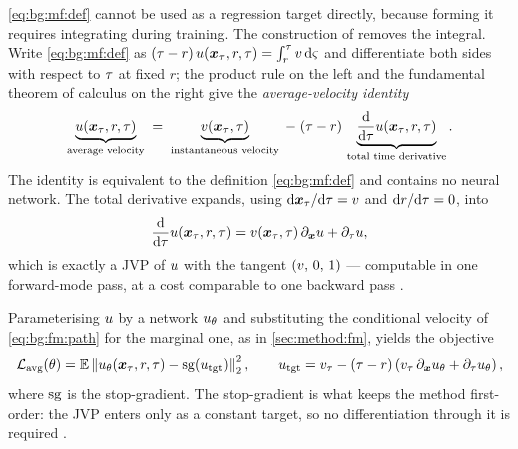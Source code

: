 \eqref{eq:bg:mf:def} cannot be used as a regression target directly, because forming it
requires integrating during training. The construction of \parencite[Eqs.~(4)--(6)]{geng2025meanflow}
removes the
integral. Write \eqref{eq:bg:mf:def} as
$(\tau-r)\,u(\boldsymbol{x}_{\tau},r,\tau) = \int_{r}^{\tau}v\,\mathrm{d}\varsigma$ and
differentiate both sides with respect to $\tau$ at fixed $r$; the product rule on the left
and the fundamental theorem of calculus on the right give the \emph{average-velocity identity}
\begin{equation}\label{eq:bg:mf:identity}
  \underbrace{u(\boldsymbol{x}_{\tau},r,\tau)}_{\text{average velocity}}
  \;=\;
  \underbrace{v(\boldsymbol{x}_{\tau},\tau)}_{\text{instantaneous velocity}}
  \;-\;(\tau-r)\,
  \underbrace{\frac{\mathrm{d}}{\mathrm{d}\tau}u(\boldsymbol{x}_{\tau},r,\tau)}_{\text{total time derivative}} .
\end{equation}
The identity is equivalent to the definition \eqref{eq:bg:mf:def} and contains no neural
network. The total derivative expands, using $\mathrm{d}\boldsymbol{x}_{\tau}/\mathrm{d}\tau = v$ and
$\mathrm{d} r/\mathrm{d}\tau = 0$, into
\begin{equation}\label{eq:bg:mf:jvp}
  \frac{\mathrm{d}}{\mathrm{d}\tau}u(\boldsymbol{x}_{\tau},r,\tau)
  = v(\boldsymbol{x}_{\tau},\tau)\,\partial_{\boldsymbol{x}}u + \partial_{\tau}u ,
\end{equation}
which is exactly a \ac{JVP} of $u$ with the tangent
$(v,\,0,\,1)$ --- computable in one forward-mode pass, at a cost comparable to one
backward pass \parencite[Eqs.~(7)--(8)]{geng2025meanflow}.

Parameterising $u$ by a network $u_{\theta}$ and substituting the conditional
velocity of \eqref{eq:bg:fm:path} for the marginal one, as in \autoref{sec:method:fm}, yields the
objective
\begin{equation}\label{eq:bg:mf:loss}
  \mathcal{L}_{\textrm{avg}}(\theta)
  = \mathbb{E}\left\|u_{\theta}(\boldsymbol{x}_{\tau},r,\tau)
      - \operatorname{sg}\!\left(u_{\textrm{tgt}}\right)\right\|_{2}^{2},
  \qquad
  u_{\textrm{tgt}} = v_{\tau} - (\tau-r)\left(
     v_{\tau}\,\partial_{\boldsymbol{x}}u_{\theta} + \partial_{\tau}u_{\theta}\right),
\end{equation}
where $\operatorname{sg}$ is the stop-gradient. The stop-gradient is what keeps the method first-order: the
\ac{JVP} enters only as a constant target, so no differentiation through it is
required \parencite[Eqs.~(9)--(11)]{geng2025meanflow}.

